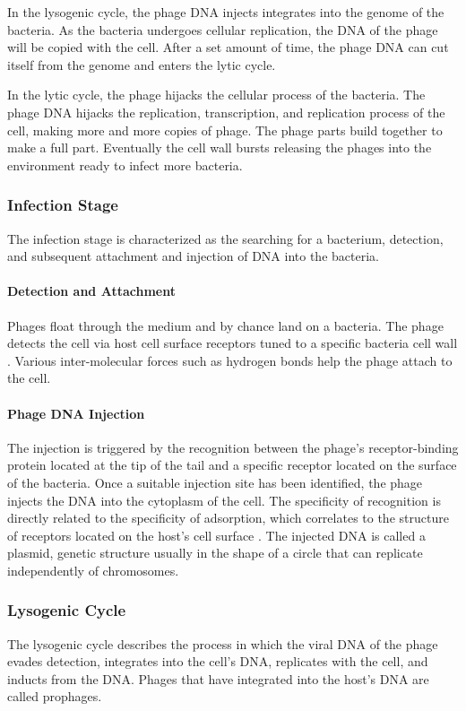 In the lysogenic cycle, the phage DNA injects integrates into the genome of the bacteria. 
As the bacteria undergoes cellular replication, the DNA of the phage will be copied with the cell. 
After a set amount of time, the phage DNA can cut itself from the genome and enters the lytic cycle.
\newline 

In the lytic cycle, the phage hijacks the cellular process of the bacteria. 
The phage DNA hijacks the replication, transcription, and replication process of the cell, making more and more copies of phage. 
The phage parts build together to make a full part. 
Eventually the cell wall bursts releasing the phages into the environment ready to infect more bacteria. 

\subsubsection{Infection Stage}
The infection stage is characterized as the searching for a bacterium, detection, and subsequent attachment and injection of DNA into the bacteria. 
\paragraph{Detection and Attachment}
Phages float through the medium and by chance land on a bacteria. The phage detects the cell via host cell surface receptors tuned to a specific bacteria cell wall \cite{stoneUnderstandingExploitingPhage2019}. 
Various inter-molecular forces such as hydrogen bonds help the phage attach to the cell. 
\paragraph{Phage DNA Injection}
The injection is triggered by the recognition between the phage's receptor-binding protein located at the tip of the tail and a specific receptor located on the surface of the bacteria. 
Once a suitable injection site has been identified, the phage injects the DNA into the cytoplasm of the cell. 
The specificity of recognition is directly related to the specificity of adsorption, which correlates to the structure of receptors located on the host's cell surface \cite{stoneUnderstandingExploitingPhage2019}. 
The injected DNA is called a plasmid, genetic structure usually in the shape of a circle that can replicate independently of chromosomes. 

\subsubsection{Lysogenic Cycle}
The lysogenic cycle describes the process in which the viral DNA of the phage evades detection, integrates into the cell's DNA, replicates with the cell, and inducts from the DNA. 
Phages that have integrated into the host's DNA are called prophages. 
